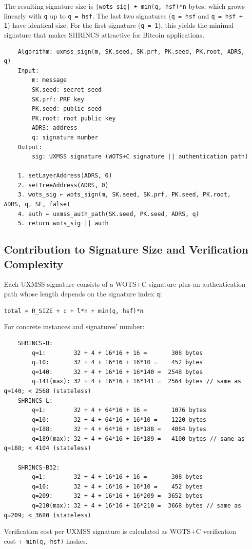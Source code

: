 The resulting signature size is \texttt{|wots\_sig| + min(q, hsf)*n} bytes, which grows linearly with \texttt{q} up to \texttt{q = hsf}. The last two signatures (\texttt{q = hsf} and \texttt{q = hsf + 1}) have identical size. For the first signature (\texttt{q = 1}), this yields the minimal signature that makes SHRINCS attractive for Bitcoin applications.
\begin{verbatim}
    Algorithm: uxmss_sign(m, SK.seed, SK.prf, PK.seed, PK.root, ADRS, q)
    Input:
        m: message
        SK.seed: secret seed
        SK.prf: PRF key
        PK.seed: public seed
        PK.root: root public key
        ADRS: address
        q: signature number 
    Output:
        sig: UXMSS signature (WOTS+C signature || authentication path)

    1. setLayerAddress(ADRS, 0)
    2. setTreeAddress(ADRS, 0)
    3. wots_sig ← wots_sign(m, SK.seed, SK.prf, PK.seed, PK.root, ADRS, q, SF, false)
    4. auth ← uxmss_auth_path(SK.seed, PK.seed, ADRS, q)
    5. return wots_sig || auth
\end{verbatim}

\subsection{Contribution to Signature Size and Verification Complexity}
Each UXMSS signature consists of a WOTS+C signature plus an authentication path whose length depends on the signature index \texttt{q}:
\begin{center}
    \texttt{total = R\_SIZE + c + l*n + min(q, hsf)*n}
\end{center}

For concrete instances and signatures' number:
\begin{verbatim}
    SHRINCS-B:
        q=1:        32 + 4 + 16*16 + 16 =       308 bytes
        q=10:       32 + 4 + 16*16 + 16*10 =    452 bytes  
        q=140:      32 + 4 + 16*16 + 16*140 =  2548 bytes
        q=141(max): 32 + 4 + 16*16 + 16*141 =  2564 bytes // same as q=140; < 2568 (stateless)
    SHRINCS-L:
        q=1:        32 + 4 + 64*16 + 16 =       1076 bytes
        q=10:       32 + 4 + 64*16 + 16*10 =    1220 bytes  
        q=188:      32 + 4 + 64*16 + 16*188 =   4084 bytes
        q=189(max): 32 + 4 + 64*16 + 16*189 =   4100 bytes // same as q=188; < 4104 (stateless)

    SHRINCS-B32:
        q=1:        32 + 4 + 16*16 + 16 =       308 bytes
        q=10:       32 + 4 + 16*16 + 16*10 =    452 bytes  
        q=209:      32 + 4 + 16*16 + 16*209 =  3652 bytes
        q=210(max): 32 + 4 + 16*16 + 16*210 =  3668 bytes // same as q=209; < 3680 (stateless)
\end{verbatim}

Verification cost per UXMSS signature is calculated as WOTS+C verification cost + \texttt{min(q, hsf)} hashes.